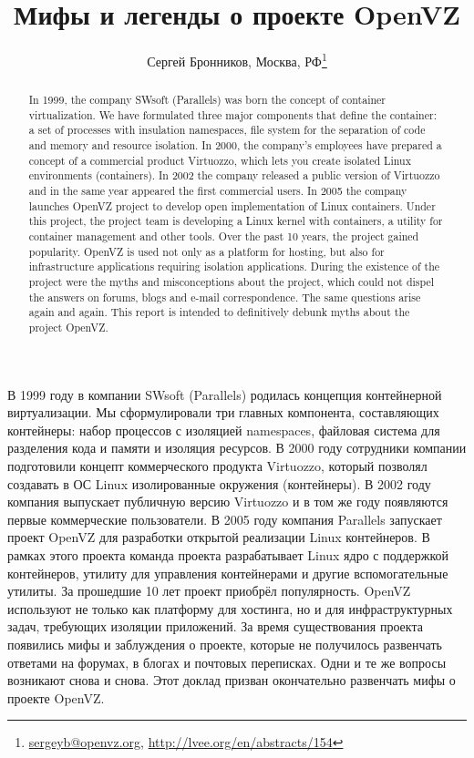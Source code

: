 \documentclass[10pt, a5paper]{article}
\begin{document}
\title{Мифы и легенды о проекте OpenVZ}
\author{Сергей Бронников, Москва, РФ\footnote{\url{sergeyb@openvz.org}, \url{http://lvee.org/en/abstracts/154}}}
\maketitle
\begin{abstract}
In 1999, the company SWsoft (Parallels) was born the concept of container virtualization. We have formulated three major compo\-nents that define the container: a set of processes with insulation namespaces, file system for the separation of code and memory and resource isolation. In 2000, the company's employees have prepared a concept of a commercial product Virtuozzo, which lets you create isolated Linux environments (containers). In 2002 the company released a public version of Virtuozzo and in the same year appeared the first commercial users. In 2005 the company launches OpenVZ project to develop open implementation of Linux containers. Under this project, the project team is developing a Linux kernel with containers, a utility for container management and other tools. Over the past 10 years, the project gained popularity. OpenVZ is used not only as a platform for hosting, but also for infrastructure applications requiring isolation applications. During the existence of the project were the myths and misconceptions about the project, which could not dispel the answers on forums, blogs and e-mail correspondence. The same questions arise again and again. This report is intended to definitively debunk myths about the project OpenVZ.
\end{abstract}
В 1999 году в компании SWsoft (Parallels) родилась концепция контейнерной виртуализации. Мы сформулировали три главных компонента, составляющих контейнеры: набор процессов с изоляцией namespaces, файловая система для разделения кода и памяти и изоляция ресурсов. В 2000 году сотрудники компании подготовили концепт коммерческого продукта Virtuozzo, который позволял создавать в ОС Linux изолированные окружения (контейнеры). В 2002 году компания выпускает публичную версию Virtuozzo и в том же году появляются первые коммерческие пользователи. В 2005 году компания Parallels запускает проект OpenVZ для разработки открытой реализации Linux контейнеров. В рамках этого проекта команда проекта разрабатывает Linux ядро с поддержкой контейнеров, утилиту для управления контейнерами и другие вспомогательные утилиты. За прошедшие 10 лет проект приобрёл популярность. OpenVZ используют не только как платформу для хостинга, но и для инфраструктурных задач, требующих изоляции приложений.  За время существования проекта появились мифы и заблуждения о проекте, которые не получилось развенчать ответами на форумах, в блогах и почтовых переписках. Одни и те же вопросы возникают снова и снова. Этот доклад призван окончательно развенчать мифы о проекте OpenVZ.
\end{document}
